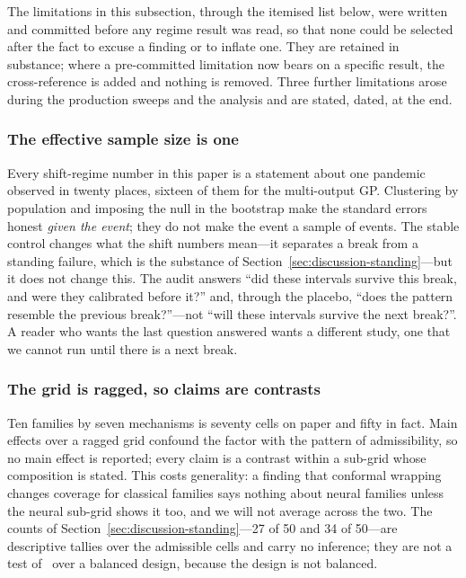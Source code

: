The limitations in this subsection, through the itemised list below, were
written and committed before any regime result was read, so that none
could be selected after the fact to excuse a finding or to inflate one.
They are retained in substance; where a pre-committed limitation now
bears on a specific result, the cross-reference is added and nothing is
removed. Three further limitations arose during the production sweeps and
the analysis and are stated, dated, at the end.

\subsubsection{The effective sample size is one}

Every shift-regime number in this paper is a statement about one pandemic
observed in twenty places, sixteen of them for the multi-output GP.
Clustering by population and imposing the null
in the bootstrap make the standard errors honest \emph{given the event};
they do not make the event a sample of events. The stable control changes
what the shift numbers mean---it separates a break from a standing
failure, which is the substance of
Section~\ref{sec:discussion-standing}---but it does not change this. The
audit answers ``did these intervals survive this break, and were they
calibrated before it?'' and, through the placebo, ``does the pattern
resemble the previous break?''---not ``will these intervals survive the
next break?''. A reader who wants the last question answered wants a
different study, one that we cannot run until there is a next break.

\subsubsection{The grid is ragged, so claims are contrasts}

Ten families by seven mechanisms is seventy cells on paper and fifty in
fact. Main effects over a ragged grid confound the factor with the
pattern of admissibility, so no main effect is reported; every claim is a
contrast within a sub-grid whose composition is stated. This costs
generality: a finding that conformal wrapping changes coverage for
classical families says nothing about neural families unless the neural
sub-grid shows it too, and we will not average across the two. The counts
of Section~\ref{sec:discussion-standing}---27 of 50 and 34 of 50---are
descriptive tallies over the admissible cells and carry no inference;
they are not a test of \Htwo\ over a balanced design, because the design
is not balanced.

